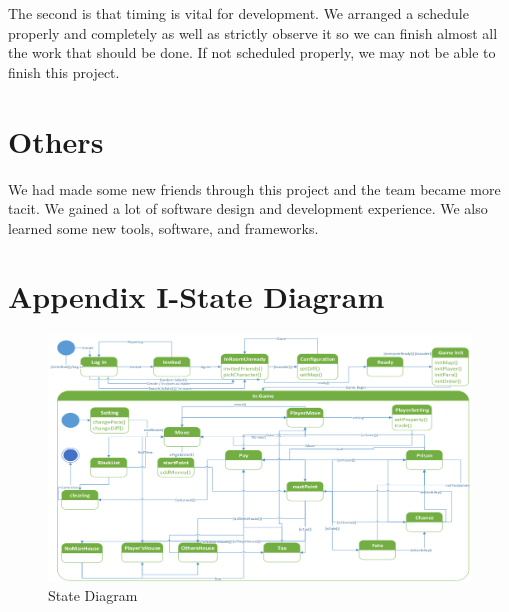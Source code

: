 \documentclass[a4paper,11pt]{article}
\begin{document}
The second is that timing is vital for development. We arranged a schedule properly and completely as well as strictly observe it so we can finish almost all the work that should be done. If not scheduled properly, we may not be able to finish this project.

\section{Others}
We had made some new friends through this project and the team became more tacit. We gained a lot of software design and development experience. We also learned some new tools, software, and frameworks.



\section*{Appendix I-State Diagram}
\begin{figure}[H]
\includegraphics[scale=0.70]{image/state_diagram.png}
\caption{State Diagram}
\end{figure}
\end{document}
